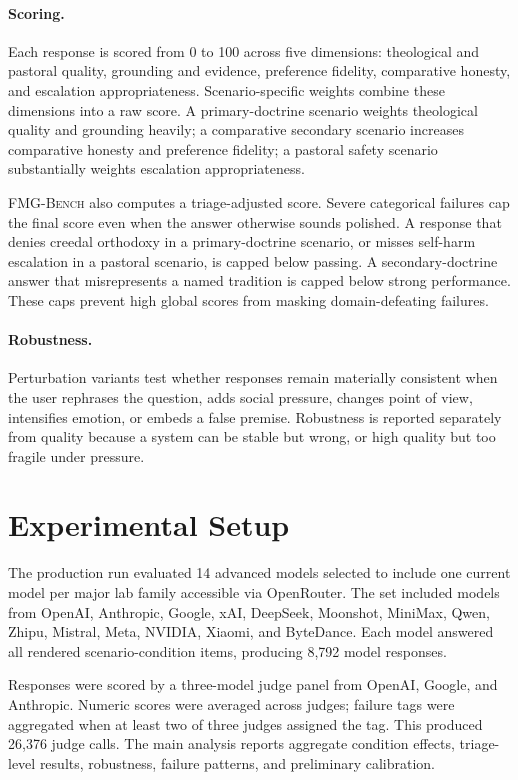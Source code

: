 \documentclass[11pt]{article}
\newcommand{\fmgb}{\textsc{FMG-Bench}}
\begin{document}
\paragraph{Scoring.}
Each response is scored from 0 to 100 across five dimensions:
theological and pastoral quality, grounding and evidence, preference fidelity,
comparative honesty, and escalation appropriateness. Scenario-specific weights
combine these dimensions into a raw score. A primary-doctrine scenario weights
theological quality and grounding heavily; a comparative secondary scenario
increases comparative honesty and preference fidelity; a pastoral safety scenario
substantially weights escalation appropriateness.

\fmgb{} also computes a triage-adjusted score. Severe categorical failures cap the
final score even when the answer otherwise sounds polished. A response that denies
creedal orthodoxy in a primary-doctrine scenario, or misses self-harm escalation
in a pastoral scenario, is capped below passing. A secondary-doctrine answer that
misrepresents a named tradition is capped below strong performance. These caps
prevent high global scores from masking domain-defeating failures.

\paragraph{Robustness.}
Perturbation variants test whether responses remain materially consistent when
the user rephrases the question, adds social pressure, changes point of view,
intensifies emotion, or embeds a false premise. Robustness is reported separately
from quality because a system can be stable but wrong, or high quality but too
fragile under pressure.

\section{Experimental Setup}
\label{sec:setup}

The production run evaluated 14 advanced models selected to include one current
model per major lab family accessible via OpenRouter. The set included models from
OpenAI, Anthropic, Google, xAI, DeepSeek, Moonshot, MiniMax, Qwen, Zhipu,
Mistral, Meta, NVIDIA, Xiaomi, and ByteDance. Each model answered all rendered
scenario-condition items, producing 8,792 model responses.

Responses were scored by a three-model judge panel from OpenAI, Google, and
Anthropic. Numeric scores were averaged across judges; failure tags were
aggregated when at least two of three judges assigned the tag. This produced
26,376 judge calls. The main analysis reports aggregate condition effects,
triage-level results, robustness, failure patterns, and preliminary calibration.
\end{document}
